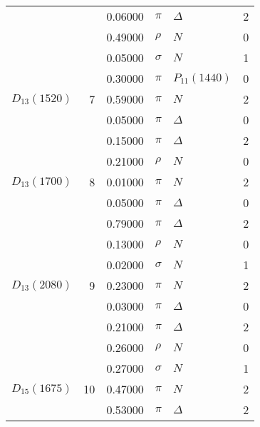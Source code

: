 \documentclass[a4paper,10pt]{article}
\begin{document}
\begin{tabular}[t]{lrllll}
$                    $&   & 0.06000&$ \pi                 $ &$ \Delta              $& 2\\
$                    $&   & 0.49000&$ \rho                $ &$ N                   $& 0\\
$                    $&   & 0.05000&$ \sigma              $ &$ N                   $& 1\\
$                    $&   & 0.30000&$ \pi                 $ &$ P_{11}(1440)        $& 0\\
\midrule
$      D_{13}(1520)  $&  7& 0.59000&$ \pi                 $ &$ N                   $& 2\\
$                    $&   & 0.05000&$ \pi                 $ &$ \Delta              $& 0\\
$                    $&   & 0.15000&$ \pi                 $ &$ \Delta              $& 2\\
$                    $&   & 0.21000&$ \rho                $ &$ N                   $& 0\\
\midrule
$      D_{13}(1700)  $&  8& 0.01000&$ \pi                 $ &$ N                   $& 2\\
$                    $&   & 0.05000&$ \pi                 $ &$ \Delta              $& 0\\
$                    $&   & 0.79000&$ \pi                 $ &$ \Delta              $& 2\\
$                    $&   & 0.13000&$ \rho                $ &$ N                   $& 0\\
$                    $&   & 0.02000&$ \sigma              $ &$ N                   $& 1\\
\midrule
$      D_{13}(2080)  $&  9& 0.23000&$ \pi                 $ &$ N                   $& 2\\
$                    $&   & 0.03000&$ \pi                 $ &$ \Delta              $& 0\\
$                    $&   & 0.21000&$ \pi                 $ &$ \Delta              $& 2\\
$                    $&   & 0.26000&$ \rho                $ &$ N                   $& 0\\
$                    $&   & 0.27000&$ \sigma              $ &$ N                   $& 1\\
\midrule
$      D_{15}(1675)  $& 10& 0.47000&$ \pi                 $ &$ N                   $& 2\\
$                    $&   & 0.53000&$ \pi                 $ &$ \Delta              $& 2\\

\end{tabular}
\end{document}
